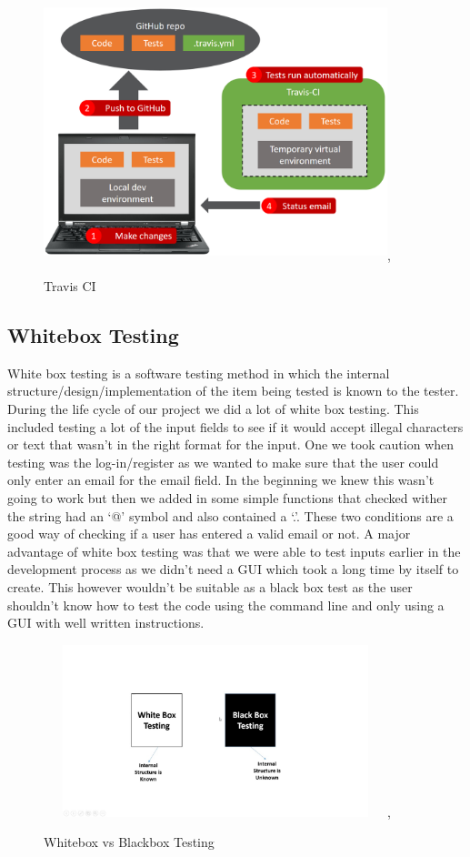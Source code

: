 \begin{figure}[ht]
\renewcommand\thefigure{3.3}
\centering
\includegraphics[width=10cm, height=7.5cm]{img/travis.png},
\caption{Travis CI}
\label{TravisCI}
\end{figure}

\subsection{Whitebox Testing}
White box testing is a software testing method in which the internal structure/design/implementation of the item being tested is known to the tester. During the life cycle of our project we did a lot of white box testing. This included testing a lot of the input fields to see if it would accept illegal characters or text that wasn’t in the right format for the input. One we took caution when testing was the log-in/register as we wanted to make sure that the user could only enter an email for the email field. In the beginning we knew this wasn’t going to work but then we added in some simple functions that checked wither the string had an ‘@’ symbol and also contained a ‘.’. These two conditions are a good way of checking if a user has entered a valid email or not. A major advantage of white box testing was that we were able to test inputs earlier in the development process as we didn’t need a GUI which took a long time by itself to create. This however wouldn’t be suitable as a black box test as the user shouldn’t know how to test the code using the command line and only using a GUI with well written instructions.

\begin{figure}[ht]
\renewcommand\thefigure{3.4}
\centering
\includegraphics[width=10cm, height=5cm]{img/whitebox.jpg},
\caption{Whitebox vs Blackbox Testing}
\label{whiteboxvblackbox}
\end{figure}

